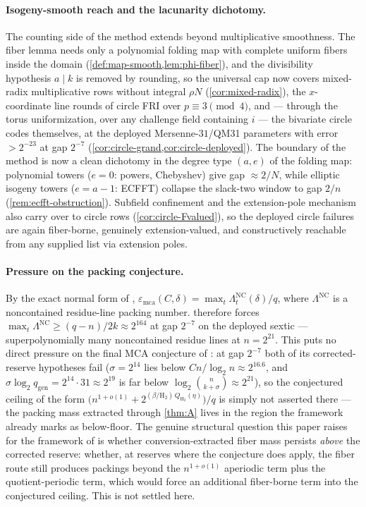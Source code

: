 \documentclass[11pt]{article}
\theoremstyle{definition}
\theoremstyle{remark}
\newcommand{\emca}{\varepsilon_{\mathrm{mca}}}
\newcommand{\Hb}{\mathrm{H}_2}
\begin{document}
\paragraph{Isogeny-smooth reach and the lacunarity dichotomy.}
The counting side of the method extends beyond multiplicative smoothness. The fiber lemma needs only a polynomial folding map with complete uniform fibers inside the domain (\cref{def:map-smooth,lem:phi-fiber}), and the divisibility hypothesis $a\mid k$ is removed by rounding, so the universal cap now covers mixed-radix multiplicative rows without integral $\rho N$ (\cref{cor:mixed-radix}), the $x$-coordinate line rounds of circle FRI over $p\equiv3\pmod4$, and --- through the torus uniformization, over any challenge field containing $i$ --- the bivariate circle codes themselves, at the deployed Mersenne-$31$/QM31 parameters with error $>2^{-23}$ at gap $2^{-7}$ (\cref{cor:circle-grand,cor:circle-deployed}). The boundary of the method is now a clean dichotomy in the degree type $(a,e)$ of the folding map: polynomial towers ($e=0$: powers, Chebyshev) give gap $\approx2/N$, while elliptic isogeny towers ($e=a-1$: ECFFT) collapse the slack-two window to gap $2/n$ (\cref{rem:ecfft-obstruction}). Subfield confinement and the extension-pole mechanism also carry over to circle rows (\cref{cor:circle-Fvalued}), so the deployed circle failures are again fiber-borne, genuinely extension-valued, and constructively reachable from any supplied list via extension poles.

\paragraph{Pressure on the packing conjecture.}
By the exact normal form of \cite{Cho26b}, $\emca(C,\delta)=\max_t\Lambda^{\mathrm{NC}}_t(\delta)/q$, where $\Lambda^{\mathrm{NC}}$ is a noncontained residue-line packing number.  therefore forces $\max_t\Lambda^{\mathrm{NC}}\ge(q-n)/2k\approx2^{164}$ at gap $2^{-7}$ on the deployed sextic --- superpolynomially many noncontained residue lines at $n=2^{21}$. This puts no direct pressure on the final MCA conjecture of \cite[Conj.\ ``Final floor- and quotient-corrected MCA asymptotic'']{Cho26b}: at gap $2^{-7}$ both of its corrected-reserve hypotheses fail ($\sigma=2^{14}$ lies below $Cn/\log_2n\approx2^{16.6}$, and $\sigma\log_2 q_{\mathrm{gen}}=2^{14}\cdot31\approx2^{19}$ is far below $\log_2\binom n{k+\sigma}\approx2^{21}$), so the conjectured ceiling of the form $\bigl(n^{1+o(1)}+2^{(\beta/\Hb)\,Q_{\Hb}(\eta)}\bigr)/q$ is simply not asserted there --- the packing mass extracted through \cref{thm:A} lives in the region the framework already marks as below-floor. The genuine structural question this paper raises for the framework of \cite{Cho26b} is whether conversion-extracted fiber mass persists \emph{above} the corrected reserve: whether, at reserves where the conjecture does apply, the fiber route still produces packings beyond the $n^{1+o(1)}$ aperiodic term plus the quotient-periodic term, which would force an additional fiber-borne term into the conjectured ceiling. This is not settled here.
\end{document}
